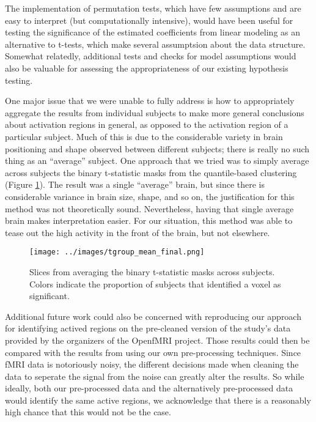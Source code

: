 \par \indent The implementation of permutation tests, which have few 
assumptions and are easy to interpret (but computationally intensive), 
would have been useful for testing the significance of the estimated 
coefficients from linear modeling as an alternative to t-tests, which make 
several assumptsion about the data structure. Somewhat relatedly, 
additional tests and checks for model assumptions would also be valuable 
for assessing the appropriateness of our existing hypothesis testing. 

\par One major issue that we were unable to fully address is how to 
appropriately aggregate the results from individual subjects to make more 
general conclusions about activation regions in general, as opposed to the 
activation region of a particular subject. Much of this is due to the 
considerable variety in brain positioning and shape observed between different 
subjects; there is really no such thing as an ``average'' subject. One 
approach that we tried was to simply average across subjects the binary 
t-statistic masks from the quantile-based clustering (Figure \ref{fig:avgt}). 
The result was a single ``average'' brain, but since there is considerable 
variance in brain size, shape, and so on, the justification for this method 
was not theoretically sound. Nevertheless, having that single average brain 
makes interpretation easier. For our situation, this method was able to tease 
out the high activity in the front of the brain, but not elsewhere. 

\begin{figure}[ht]
\centering
	\texttt{[image: ../images/tgroup\_mean\_final.png]} 
	\caption{Slices from averaging the binary t-statistic masks across 
subjects. Colors indicate the proportion of subjects that identified a voxel 
as significant.}
	\label{fig:avgt}
\end{figure}

\par Additional future work could also be concerned with reproducing our 
approach for identifying actived regions on the pre-cleaned version of the 
study's data provided by the organizers of the OpenfMRI project. Those results 
could then be compared with the results from using our own pre-processing 
techniques. Since fMRI data is notoriously noisy, the different decisions made 
when cleaning the data to seperate the signal from the noise can greatly alter 
the results. So while ideally, both our pre-processed data and the 
alternatively pre-processed data would identify the same active regions, we 
acknowledge that there is a reasonably high chance that this would not be the 
case. 

